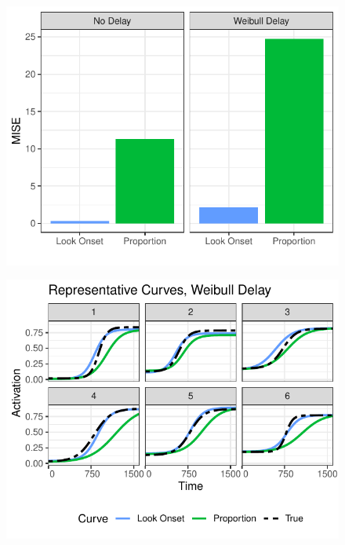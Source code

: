 \documentclass{beamer}
\begin{document}
\begin{frame}
\begin{figure}
\centering
\includegraphics{mise_bar.pdf}
\end{figure}
\end{frame}

\begin{frame}
\begin{figure}[H]
\centering
\includegraphics{rep_curves_weibull_delay.pdf}
\end{figure}
\end{frame}
\end{document}
